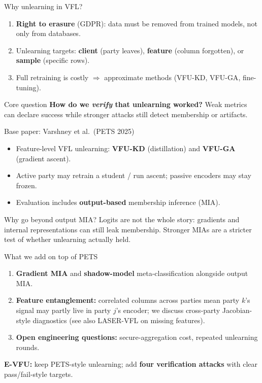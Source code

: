 \documentclass[aspectratio=169, 11pt]{beamer}
\begin{document}
\begin{frame}{Why unlearning in VFL?}
  \begin{enumerate}
    \item \textbf{Right to erasure} (GDPR): data must be removed from trained models, not only from databases.
    \item Unlearning targets: \textbf{client} (party leaves), \textbf{feature} (column forgotten), or \textbf{sample} (specific rows).
    \item Full retraining is costly $\Rightarrow$ approximate methods (\textsc{VFU-KD}, \textsc{VFU-GA}, fine-tuning).
  \end{enumerate}
  \vspace{0.4em}
  \begin{alertblock}{Core question}
    \textbf{How do we \emph{verify} that unlearning worked?} Weak metrics can declare success while stronger attacks still detect membership or artifacts.
  \end{alertblock}
\end{frame}

\begin{frame}{Base paper: Varshney et al.\ (PETS 2025)}
  \begin{itemize}
    \item Feature-level VFL unlearning: \textbf{VFU-KD} (distillation) and \textbf{VFU-GA} (gradient ascent).
    \item Active party may retrain a student / run ascent; passive encoders may stay frozen.
    \item Evaluation includes \textbf{output-based} membership inference (MIA).
  \end{itemize}
  \vspace{0.35em}
  \begin{alertblock}{Why go beyond output MIA?}
    Logits are not the whole story: gradients and internal representations can still leak membership. Stronger MIAs are a stricter test of whether unlearning actually held.
  \end{alertblock}
\end{frame}

\begin{frame}{What we add on top of PETS}
  \begin{enumerate}
    \item \textbf{Gradient MIA} and \textbf{shadow-model} meta-classification alongside output MIA.
    \item \textbf{Feature entanglement:} correlated columns across parties mean party $k$'s signal may partly live in party $j$'s encoder; we discuss cross-party Jacobian-style diagnostics (see also LASER-VFL on missing features).
    \item \textbf{Open engineering questions:} secure-aggregation cost, repeated unlearning rounds.
  \end{enumerate}
  \vspace{0.4em}
  \textbf{E-VFU:} keep PETS-style unlearning; add \textbf{four verification attacks} with clear pass/fail-style targets.
\end{frame}
\end{document}
